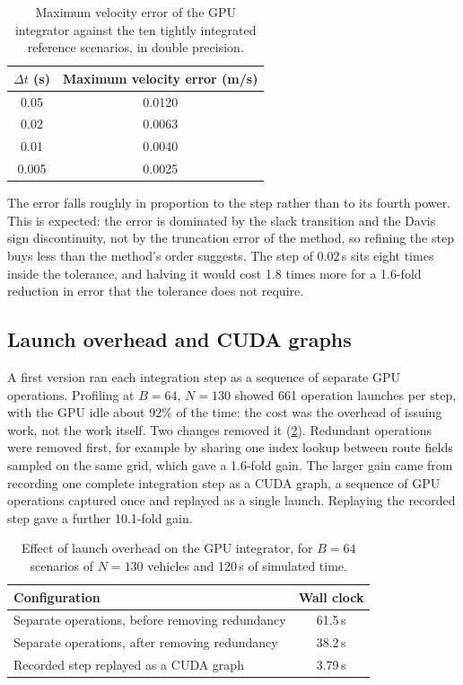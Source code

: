 \begin{table}[htbp]
    \centering
    \begin{tabular}{cc}
        \toprule
        $\Delta t$ (s) & Maximum velocity error (m/s) \\
        \midrule
        0.05  & 0.0120 \\
        0.02  & 0.0063 \\
        0.01  & 0.0040 \\
        0.005 & 0.0025 \\
        \bottomrule
    \end{tabular}
    \caption{Maximum velocity error of the GPU integrator against the ten tightly integrated reference scenarios, in double precision.}
    \label{tab:gpu_step_size}
\end{table}

The error falls roughly in proportion to the step rather than to its fourth power. This is expected: the error is dominated by the slack transition and the Davis sign discontinuity, not by the truncation error of the method, so refining the step buys less than the method's order suggests. The step of $0.02$\,s sits eight times inside the tolerance, and halving it would cost 1.8 times more for a 1.6-fold reduction in error that the tolerance does not require.

\subsection{Launch overhead and CUDA graphs}

A first version ran each integration step as a sequence of separate GPU operations. Profiling at $B = 64$, $N = 130$ showed 661 operation launches per step, with the GPU idle about 92\% of the time: the cost was the overhead of issuing work, not the work itself. Two changes removed it (\cref{tab:gpu_launch}). Redundant operations were removed first, for example by sharing one index lookup between route fields sampled on the same grid, which gave a 1.6-fold gain. The larger gain came from recording one complete integration step as a CUDA graph, a sequence of GPU operations captured once and replayed as a single launch. Replaying the recorded step gave a further 10.1-fold gain.

\begin{table}[htbp]
    \centering
    \begin{tabular}{lc}
        \toprule
        Configuration & Wall clock \\
        \midrule
        Separate operations, before removing redundancy & 61.5\,s \\
        Separate operations, after removing redundancy  & 38.2\,s \\
        Recorded step replayed as a CUDA graph          & 3.79\,s \\
        \bottomrule
    \end{tabular}
    \caption{Effect of launch overhead on the GPU integrator, for $B = 64$ scenarios of $N = 130$ vehicles and 120\,s of simulated time.}
    \label{tab:gpu_launch}
\end{table}

